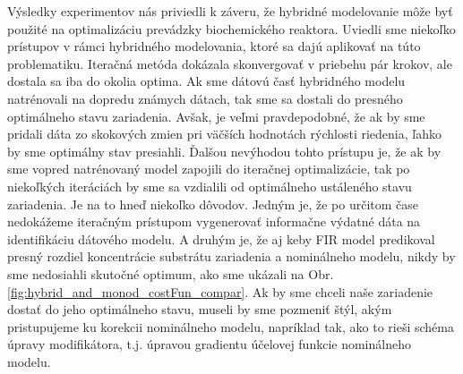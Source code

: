Výsledky experimentov nás priviedli k záveru, že hybridné modelovanie môže byť použité na optimalizáciu prevádzky biochemického reaktora. Uviedli sme niekoľko prístupov v rámci hybridného modelovania, ktoré sa dajú aplikovať na túto problematiku. Iteračná metóda dokázala skonvergovať v priebehu pár krokov, ale dostala sa iba do okolia optima. Ak sme dátovú časť hybridného modelu natrénovali na dopredu známych dátach, tak sme sa dostali do presného optimálneho stavu zariadenia. Avšak, je veľmi pravdepodobné, že ak by sme pridali dáta zo skokových zmien pri väčších hodnotách rýchlosti riedenia, ľahko by sme optimálny stav presiahli. Ďalšou nevýhodou tohto prístupu je, že ak by sme vopred natrénovaný model zapojili do iteračnej optimalizácie, tak po niekoľkých iteráciách by sme sa vzdialili od optimálneho ustáleného stavu zariadenia. Je na to hneď niekoľko dôvodov. Jedným je, že po určitom čase nedokážeme iteračným prístupom vygenerovať informačne výdatné dáta na identifikáciu dátového modelu. A druhým je, že aj keby FIR model predikoval presný rozdiel koncentrácie substrátu zariadenia a nominálneho modelu, nikdy by sme nedosiahli skutočné optimum, ako sme ukázali na Obr. \ref{fig:hybrid_and_monod_costFun_compar}. Ak by sme chceli naše zariadenie dostať do jeho optimálneho stavu, museli by sme pozmeniť štýl, akým pristupujeme ku korekcii nominálneho modelu, napríklad tak, ako to rieši schéma úpravy modifikátora, t.j. úpravou gradientu účelovej funkcie nominálneho modelu. 
